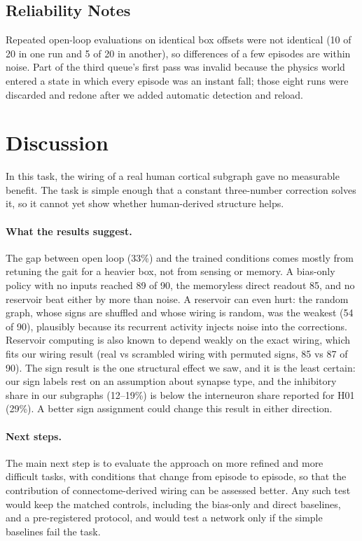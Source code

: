 \documentclass[11pt]{article}
\begin{document}
\subsection{Reliability Notes}
Repeated open-loop evaluations on identical box offsets were not identical (10 of 20 in one run and 5 of 20 in another), so differences of a few episodes are within noise. Part of the third queue's first pass was invalid because the physics world entered a state in which every episode was an instant fall; those eight runs were discarded and redone after we added automatic detection and reload.

\section{Discussion}
In this task, the wiring of a real human cortical subgraph gave no measurable benefit. The task is simple enough that a constant three-number correction solves it, so it cannot yet show whether human-derived structure helps.

\paragraph{What the results suggest.} The gap between open loop (33\%) and the trained conditions comes mostly from retuning the gait for a heavier box, not from sensing or memory. A bias-only policy with no inputs reached 89 of 90, the memoryless direct readout 85, and no reservoir beat either by more than noise. A reservoir can even hurt: the random graph, whose signs are shuffled and whose wiring is random, was the weakest (54 of 90), plausibly because its recurrent activity injects noise into the corrections. Reservoir computing is also known to depend weakly on the exact wiring, which fits our wiring result (real vs scrambled wiring with permuted signs, 85 vs 87 of 90). The sign result is the one structural effect we saw, and it is the least certain: our sign labels rest on an assumption about synapse type, and the inhibitory share in our subgraphs (12--19\%) is below the interneuron share reported for H01 (29\%). A better sign assignment could change this result in either direction.

\paragraph{Next steps.} The main next step is to evaluate the approach on more refined and more difficult tasks, with conditions that change from episode to episode, so that the contribution of connectome-derived wiring can be assessed better. Any such test would keep the matched controls, including the bias-only and direct baselines, and a pre-registered protocol, and would test a network only if the simple baselines fail the task.
\end{document}
